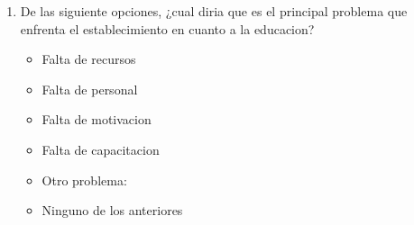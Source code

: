 \documentclass{article}
\begin{document}
\begin{enumerate}
        \underline{\hspace{0.95\linewidth}} \vspace{0.3cm} \\
        \underline{\hspace{0.95\linewidth}} \vspace{0.3cm}
    \item De las siguiente opciones, ¿cual diria que es el principal problema que enfrenta el establecimiento en cuanto a la educacion?
        \begin{itemize}[label=$\square$]
            \item Falta de recursos
            \item Falta de personal
            \item Falta de motivacion
            \item Falta de capacitacion
            \item Otro problema: \underline{\hspace{0.5\linewidth}}
            \item Ninguno de los anteriores
        \end{itemize}
\end{enumerate}

\newpage
\end{document}
